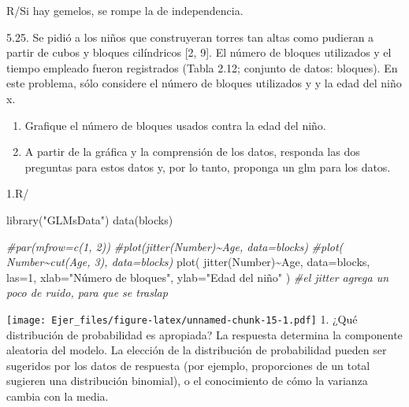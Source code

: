 \documentclass[
]{article}
\newenvironment{Shaded}{\begin{snugshade}}{\end{snugshade}}
\newcommand{\AttributeTok}[1]{\textcolor[rgb]{0.77,0.63,0.00}{#1}}
\newcommand{\CommentTok}[1]{\textcolor[rgb]{0.56,0.35,0.01}{\textit{#1}}}
\newcommand{\DecValTok}[1]{\textcolor[rgb]{0.00,0.00,0.81}{#1}}
\newcommand{\FunctionTok}[1]{\textcolor[rgb]{0.00,0.00,0.00}{#1}}
\newcommand{\NormalTok}[1]{#1}
\newcommand{\SpecialCharTok}[1]{\textcolor[rgb]{0.00,0.00,0.00}{#1}}
\newcommand{\StringTok}[1]{\textcolor[rgb]{0.31,0.60,0.02}{#1}}
\begin{document}
R/Si hay gemelos, se rompe la de independencia.

5.25. Se pidió a los niños que construyeran torres tan altas como
pudieran a partir de cubos y bloques cilíndricos {[}2, 9{]}. El número
de bloques utilizados y el tiempo empleado fueron registrados (Tabla
2.12; conjunto de datos: bloques). En este problema, sólo considere el
número de bloques utilizados y y la edad del niño x.

\begin{enumerate}
\def\labelenumi{\arabic{enumi}.}
\item
  Grafique el número de bloques usados contra la edad del niño.
\item
  A partir de la gráfica y la comprensión de los datos, responda las dos
  preguntas para estos datos y, por lo tanto, proponga un glm para los
  datos.
\end{enumerate}

1.R/

\begin{Shaded}
\begin{Highlighting}[]
\FunctionTok{library}\NormalTok{(}\StringTok{"GLMsData"}\NormalTok{) }
\FunctionTok{data}\NormalTok{(blocks)}

 \CommentTok{\#par(mfrow=c(1, 2))}
 \CommentTok{\#plot(jitter(Number)\textasciitilde{}Age, data=blocks)}
 \CommentTok{\#plot( Number\textasciitilde{}cut(Age, 3), data=blocks)}
\FunctionTok{plot}\NormalTok{( }\FunctionTok{jitter}\NormalTok{(Number)}\SpecialCharTok{\textasciitilde{}}\NormalTok{Age,  }\AttributeTok{data=}\NormalTok{blocks, }\AttributeTok{las=}\DecValTok{1}\NormalTok{,}
\AttributeTok{xlab=}\StringTok{"Número de bloques"}\NormalTok{, }\AttributeTok{ylab=}\StringTok{"Edad del niño"}\NormalTok{ ) }\CommentTok{\#el jitter agrega un poco de ruido, para que se traslap}
\end{Highlighting}
\end{Shaded}

\texttt{[image: Ejer\_files/figure-latex/unnamed-chunk-15-1.pdf]} 1. ¿Qué
distribución de probabilidad es apropiada? La respuesta determina la
componente aleatoria del modelo. La elección de la distribución de
probabilidad pueden ser sugeridos por los datos de respuesta (por
ejemplo, proporciones de un total sugieren una distribución binomial), o
el conocimiento de cómo la varianza cambia con la media.

\begin{Shaded}
\end{Shaded}
\end{document}
